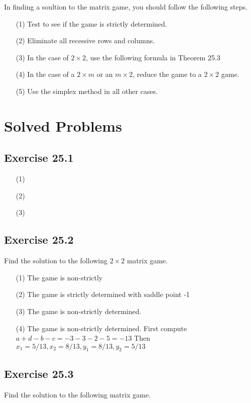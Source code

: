 \documentclass[]{report}
\begin{document}
In finding a soultion to the matrix game, you should follow the following steps.
\begin{itemize}
\item[(1)] Test to see if the game is strictly determined.
\item[(2)] Eliminate all recessive rows and columns.
\item[(3)] In the case of $2 \times 2$, use the following formula in Theorem 25.3
\item[(4)] In the case of a $2 \times m$ or an $m \times 2$, reduce the game to a $2 \times 2$ game.
\item[(5)] Use the simplex method in all other cases.
\end{itemize}



\section*{Solved Problems}


\subsection{Exercise 25.1}

\begin{itemize}
\item[(1)]
\item[(2)]
\item[(3)]
\end{itemize}

\subsection{Exercise 25.2}
Find the solution to the following $2 \times 2$ matrix game.

\begin{itemize}
\item[(1)] The game is non-strictly
\item[(2)] The game is strictly determined with saddle point -1
\item[(3)] The game is non-strictly determined.
\item[(4)] The game is non-strictly determined. First compute $a+d-b-c = -3-3-2-5 = -13$
Then $x_1 = 5/13, x_2 = 8/13,y_1=8/13,y_2=5/13$
\end{itemize}

\subsection{Exercise 25.3}
Find the solution to the following matrix game.
\end{document}
